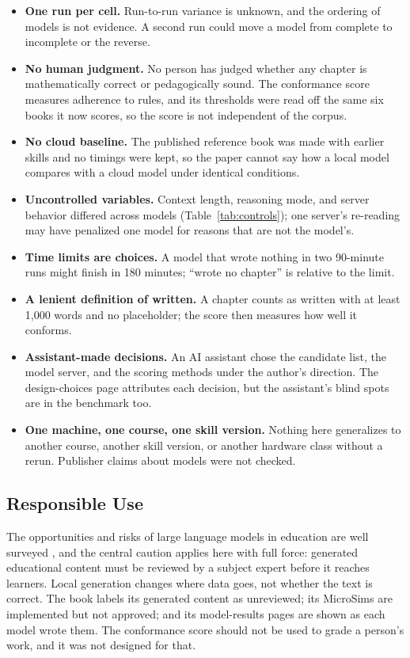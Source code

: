 \begin{itemize}
\item \textbf{One run per cell.} Run-to-run variance is unknown, and the ordering of models is not evidence. A second run could move a model from complete to incomplete or the reverse.
\item \textbf{No human judgment.} No person has judged whether any chapter is mathematically correct or pedagogically sound. The conformance score measures adherence to rules, and its thresholds were read off the same six books it now scores, so the score is not independent of the corpus.
\item \textbf{No cloud baseline.} The published reference book was made with earlier skills and no timings were kept, so the paper cannot say how a local model compares with a cloud model under identical conditions.
\item \textbf{Uncontrolled variables.} Context length, reasoning mode, and server behavior differed across models (Table~\ref{tab:controls}); one server's re-reading may have penalized one model for reasons that are not the model's.
\item \textbf{Time limits are choices.} A model that wrote nothing in two 90-minute runs might finish in 180 minutes; ``wrote no chapter'' is relative to the limit.
\item \textbf{A lenient definition of written.} A chapter counts as written with at least 1,000 words and no placeholder; the score then measures how well it conforms.
\item \textbf{Assistant-made decisions.} An AI assistant chose the candidate list, the model server, and the scoring methods under the author's direction. The design-choices page attributes each decision, but the assistant's blind spots are in the benchmark too.
\item \textbf{One machine, one course, one skill version.} Nothing here generalizes to another course, another skill version, or another hardware class without a rerun. Publisher claims about models were not checked.
\end{itemize}

\subsection{Responsible Use}

The opportunities and risks of large language models in education are well surveyed \cite{kasneci2023chatgpt}, and the central caution applies here with full force: generated educational content must be reviewed by a subject expert before it reaches learners. Local generation changes where data goes, not whether the text is correct. The book labels its generated content as unreviewed; its MicroSims are implemented but not approved; and its model-results pages are shown as each model wrote them. The conformance score should not be used to grade a person's work, and it was not designed for that.
